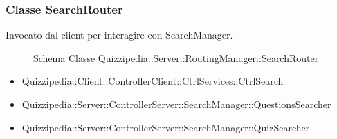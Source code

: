 \subsubsection{Classe SearchRouter}
Invocato dal client per interagire con SearchManager.
\begin{figure}[H]
\centering
\noindent{}
\caption{Schema Classe Quizzipedia::Server::RoutingManager::SearchRouter}
\end{figure}
\begin{itemize}
\item Quizzipedia::Client::ControllerClient::CtrlServices::CtrlSearch
\end{itemize}
\begin{itemize}
\item Quizzipedia::Server::ControllerServer::SearchManager::QuestionsSearcher
\item Quizzipedia::Server::ControllerServer::SearchManager::QuizSearcher
\end{itemize}

